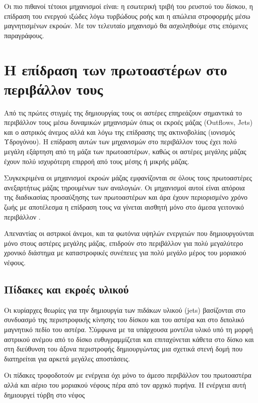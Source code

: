 \documentclass[a4paper,12pt]{memoir}
\begin{document}
Οι πιο πιθανοί τέτοιοι μηχανισμοί είναι: η εσωτερική τριβή του ρευστού του δίσκου, η επίδραση του ενεργού ιξώδες λόγω τυρβώδους ροής και η απώλεια στροφορμής μέσω μαγνητισμένων εκροών.
Με τον τελευταίο μηχανισμό θα ασχοληθούμε στις επόμενες παραγράφους.

\section{Η επίδραση των πρωτοαστέρων στο περιβάλλον τους}

Από τις πρώτες στιγμές της δημιουργίας τους οι αστέρες επηρεάζουν σημαντικά το περιβάλλον τους μέσω δυναμικών μηχανισμών όπως οι εκροές μάζας (Outflows, Jets) και ο αστρικός άνεμος αλλά και λόγω της επίδρασης της ακτινοβολίας (ιονισμός Υδρογόνου). Η επίδραση αυτών των μηχανισμών στο περιβάλλον τους έχει πολύ μεγάλη εξάρτηση από τη μάζα των πρωτοαστέρων, καθώς οι αστέρες μεγάλης μάζας έχουν πολύ ισχυρότερη επιρροή από τους μέσης ή μικρής μάζας.

Συγκεκριμένα οι μηχανισμοί εκροών μάζας εμφανίζονται σε όλους τους πρωτοαστέρες ανεξαρτήτως μάζας τηρουμένων των αναλογιών. Οι μηχανισμοί αυτοί είναι απόροια της διαδικασίας προσαύξησης των πρωτοαστέρων και άρα έχουν περιορισμένο χρόνο ζωής με αποτέλεσμα η επίδραση τους να γίνεται αισθητή μόνο στο άμεσα γειτονικό περιβάλλον . 

Απεναντίας οι αστρικοί άνεμοι, και τα φωτόνια υψηλών ενεργειών που δημιουργούνται μόνο στους αστέρες μεγάλης μάζας, επιδρούν στο περιβάλλον για πολύ μεγαλύτερο χρονικό διάστημα με καταστροφικές συνέπειες για πολύ μεγάλο μέρος του μοριακού νέφους.


\subsection{Πίδακες και εκροές υλικού}
Οι κυρίαρχες θεωρίες για την δημιουργία των πιδάκων υλικού (jets) βασίζονται στο συνδυασμό της περιστροφικής κίνησης του δίσκου και του αστέρα και στο διπολικό μαγνητικό πεδίο του αστέρα. 
Σύμφωνα με τα υπάρχουσα μοντέλα υλικό υπό τη μορφή αστρικού ανέμου από το δίσκο ευθυγραμμίζεται και επιταχύνεται κάθετα στο δίσκο και στη διεύθυνση του άξονα περιστροφής δημιουργώντας μια σχετικά στενή δομή που διατηρείται για αρκετά μεγάλες αποστάσεις.

Οι πίδακες τροφοδοτούν με ενέργεια όχι μόνο το άμεσο περιβάλλον του πρωτοαστέρα αλλά και αέριο του μοριακού νέφους πέρα από τον αρχικό πυρήνα. Η ενέργεια αυτή δημιουργεί τύρβη στο νέφος
\end{document}

